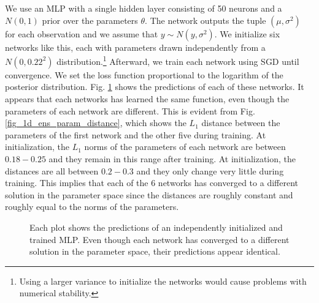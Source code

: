 \documentclass[12pt]{article}
\begin{document}
We use an MLP with a single hidden layer consisting of 50 neurons and a $N(0, 1)$ prior over the parameters $\theta$. The network outputs the tuple $(\mu, \sigma^2)$ for each observation and we assume that $y \sim N(y, \sigma^2)$. We initialize six networks like this, each with parameters drawn independently from a $N(0, 0.22^2)$ distribution.\footnote{Using a larger variance to initialize the networks would cause problems with numerical stability.} Afterward, we train each network using SGD until convergence. We set the loss function proportional to the logarithm of the posterior distribution. Fig. \ref{fig_1d_ens_predictions} shows the predictions of each of these networks. It appears that each networks has learned the same function, even though the parameters of each network are different. This is evident from Fig. \ref{fig_1d_ens_param_distance}, which shows the $L_1$ distance between the parameters of the first network and the other five during training. At initialization, the $L_1$ norms of the parameters of each network are between $0.18 - 0.25$ and they remain in this range after training. At initialization, the distances are all between $0.2 - 0.3$ and they only change very little during training. This implies that each of the 6 networks has converged to a different solution in the parameter space since the distances are roughly constant and roughly equal to the norms of the parameters.

\begin{figure}[H]
\centering
{}
\caption{Each plot shows the predictions of an independently initialized and trained MLP. Even though each network has converged to a different solution in the parameter space, their predictions appear identical.}
\label{fig_1d_ens_predictions}
\end{figure}
\end{document}
